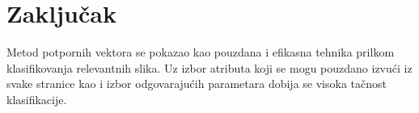 \documentclass[a4paper]{article}
\begin{document}
\section{Zaključak}
\label{sec:zakljucak}

Metod potpornih vektora se pokazao kao pouzdana i efikasna tehnika prilkom klasifikovanja relevantnih slika. Uz izbor atributa koji se mogu pouzdano izvući iz svake stranice kao i izbor odgovarajućih parametara dobija se visoka tačnost klasifikacije. 

 


\end{document}
